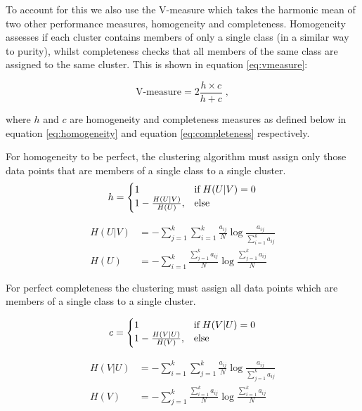 To account for this we also use the V-measure \citep{Rosenberg2007} which  takes the harmonic mean of two other performance measures, homogeneity and completeness. Homogeneity assesses if each cluster contains members of only a single class (in a similar way to purity), whilst completeness checks that all members of the same class are assigned to the same cluster. This is shown in equation \eqref{eq:vmeasure}:

\begin{equation}
  \label{eq:vmeasure}
  \text{V-measure} = 2 \frac{h \times c}{h + c} \;,
\end{equation}

where $h$ and $c$ are homogeneity and completeness measures as defined below in equation  \eqref{eq:homogeneity} and equation \eqref{eq:completeness} respectively. 

For homogeneity to be perfect, the clustering algorithm must assign only those data points that are members of a single class to a single cluster.
\begin{equation}
\label{eq:homogeneity}
  h=\left\{
  \begin{array}{@{}ll@{}}
    1  & \text{if} \;  H(U|V) = 0 \\
    1 - \frac{H(U|V)}{H(U)}, & \text{else}
  \end{array}\right.
\end{equation} 

\begin{align}
  \label{eq:H(U|V)}
H(U|V) &=  - \sum_{j=1}^{k} \sum_{i=1}^{k}\frac{a_{ij}}{N} \log \frac{a_{ij}}{\sum_{i=1}^{k}a_{ij}}\\
H(U) &=  - \sum_{i=1}^{k} \frac{\sum_{j=1}^{k}a_{ij}}{N} \log \frac{\sum_{j=1}^{k}a_{ij}}{N}
\end{align}

For perfect completeness the clustering must assign all data points which are members of a single class to a single cluster.

\begin{equation}
\label{eq:completeness}
 c=\left\{
  \begin{array}{@{}ll@{}}
    1  & \text{if} \;  H(V|U) = 0 \\
    1 - \frac{H(V|U)}{H(V)}, & \text{else}
  \end{array}\right.
\end{equation} 

\begin{align}
  \label{eq:H(V|U)}
H(V|U) &=  - \sum_{i=1}^{k} \sum_{j=1}^{k}\frac{a_{ij}}{N} \log \frac{a_{ij}}{\sum_{j=1}^{k}a_{ij}}\\
H(V) &=  - \sum_{j=1}^{k} \frac{\sum_{i=1}^{k}a_{ij}}{N} \log \frac{\sum_{i=1}^{k}a_{ij}}{N}
\end{align}

